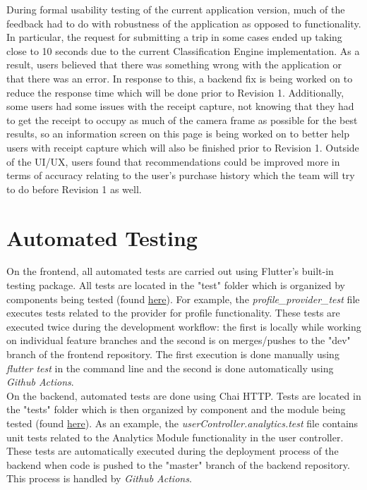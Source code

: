 \documentclass[12pt, titlepage]{article}
\begin{document}
During formal usability testing of the current application version, much of the feedback had to do with robustness
of the application as opposed to functionality. In particular, the request for submitting a trip
in some cases ended up taking close to 10 seconds due to the current Classification Engine implementation. As
a result, users believed that there was something wrong with the application or that there was an error. In response to this,
a backend fix is being worked on to reduce the response time which will be done prior to Revision 1.
Additionally, some users had some issues with the receipt capture, not knowing that they had to get the
receipt to occupy as much of the camera frame as possible for the best results, so an information screen
on this page is being worked on to better help users with receipt capture which will also be finished
prior to Revision 1. Outside of the UI/UX, users found that recommendations could be improved more
in terms of accuracy relating to the user's purchase history which the team will try to do before Revision 1
as well.

\section{Automated Testing}

On the frontend, all automated tests are carried out using Flutter's built-in testing package.
All tests are located in the "test" folder which is organized by components being tested (found 
\href{https://github.com/allanfang1/grocery_spending_tracker_app/tree/main}{here}). For example,
the \textit{profile\_provider\_test} file executes tests related to the provider for profile functionality.
These tests are executed twice during the development workflow: the first is locally while working on
individual feature branches and the second is on merges/pushes to the "dev" branch of the frontend repository.
The first execution is done manually using \textit{flutter test} in the command line and the second is done
automatically using \textit{Github Actions}.\\

On the backend, automated tests are done using Chai HTTP. Tests are located in the "tests" folder which
is then organized by component and the module being tested 
(found \href{https://github.com/grocery-spending-tracker/grocery-spending-tracker-backend/tree/master/tests}{here}).
As an example, the \textit{userController.analytics.test} file contains unit tests related to the Analytics Module
functionality in the user controller.
These tests are automatically executed during the deployment process of the backend when code is pushed to the
"master" branch of the backend repository. This process is handled by \textit{Github Actions}.
\end{document}
